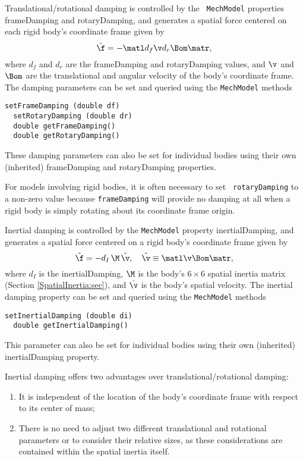 Translational/rotational damping is controlled by the {\tt
MechModel} properties {\sf frameDamping} and {\sf rotaryDamping}, and
generates a spatial force centered on each rigid body's coordinate
frame given by
%
\begin{equation}
\hat\f = - \matl d_f \v \\ d_r \Bom \matr,
\end{equation}
%
where $d_f$ and $d_r$ are the {\sf frameDamping} and {\sf
rotaryDamping} values, and $\v$ and $\Bom$ are the translational
and angular velocity of the body's coordinate frame.  The damping
parameters can be set and queried using the {\tt MechModel} methods
\begin{lstlisting}[]
  setFrameDamping (double df)
  setRotaryDamping (double dr)
  double getFrameDamping()
  double getRotaryDamping()
\end{lstlisting}
%
These damping parameters can also be set for individual bodies using
their own (inherited) {\sf frameDamping} and {\sf rotaryDamping}
properties.

\begin{sideblock}
For models involving rigid bodies, it is often necessary to set {\tt
rotaryDamping} to a non-zero value because {\tt frameDamping} will
provide no damping at all when a rigid body is simply rotating about
its coordinate frame origin.
\end{sideblock}

Inertial damping is controlled by the {\tt MechModel} property {\sf
inertialDamping}, and generates a spatial force centered on a rigid
body's coordinate frame given by
%
\begin{equation}
\hat\f = -d_I \, \M \, \hat\v, \quad \hat\v \equiv 
\matl \v \\ \Bom \matr,
\end{equation}
%
where $d_I$ is the {\sf inertialDamping}, $\M$ is the body's $6 \times
6$ spatial inertia matrix (Section \ref{SpatialInertia:sec}), and
$\hat\v$ is the body's spatial velocity. The inertial damping property
can be set and queried using the {\tt MechModel} methods
\begin{lstlisting}[]
  setInertialDamping (double di)
  double getInertialDamping()
\end{lstlisting}
%
This parameter can also be set for individual bodies using their own
(inherited) {\sf inertialDamping} property.

\begin{sideblock}
Inertial damping offers two advantages over translational/rotational damping:
\begin{enumerate}

\item It is independent of the location of the body's coordinate
frame with respect to its center of mass;

\item 
There is no need to adjust two different translational and rotational
parameters or to consider their relative sizes, as these
considerations are contained within the spatial inertia itself.

\end{enumerate}
\end{sideblock}

